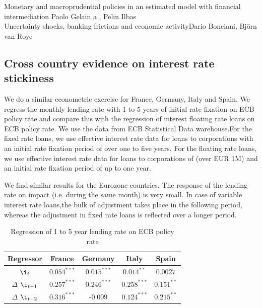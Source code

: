 \documentclass[12pt]{article}
\numberwithin{equation}{section}
\begin{document}
Monetary and macroprudential policies in an estimated model with financial intermediation
Paolo Gelain a , Pelin Ilbas \\


Uncertainty shocks, banking frictions and economic activityDario Bonciani, Björn van Roye \\



\begin{appendix}

\section*{Cross country evidence on interest rate stickiness}

We do a similar econometric exercise for France, Germany, Italy and Spain. We regress the monthly lending rate with 1 to 5 years of initial rate fixation on ECB policy rate and compare this with the regression of interest floating rate loans on ECB policy rate. We use the data from ECB Statistical Data warehouse.For the fixed rate loans, we use effective interest rate data for loans to corporations with an initial rate fixation  period of over one  to five years. For the floating rate loans, we use effective interest rate data for loans to corporations of (over EUR 1M) and an initial rate fixation period of up to one year.

We find similar results for the Eurozone countries. The response of the lending rate on impact (i.e. during the same month) is very small. In case of variable interest rate loans,the bulk of adjustment takes place in the following period, whereas the adjustment in fixed rate loans is reflected over a longer period.
 
\begin {table}[H]
\caption {Regression of 1 to 5 year lending rate on ECB policy rate} \label{tab:title} 
\begin{center}
	\begin{tabular}{||c c c c c||} 
		\hline
		Regressor &  France & Germany& Italy & Spain \\ [0.5ex] 
		\hline\hline
		$\i_{t}$ & $0.054^{***}$& $0.015^{***}$ & $0.014^{**}$& $0.0027$ \\ 
		\hline
		$\Delta$ $\i_{t-1}$& $0.257^{***}$& $0.246^{***}$& $0.258^{***}$& $0.151^{**}$ \\ 
		\hline
		$\Delta$ $\i_{t-2}$&$0.316^{***}$ &-$0.009$& $0.124^{***}$& $0.215^{**}$ \\
		

\end{tabular}
\end{center}
\end{table}
\end{appendix}
\end{document}
